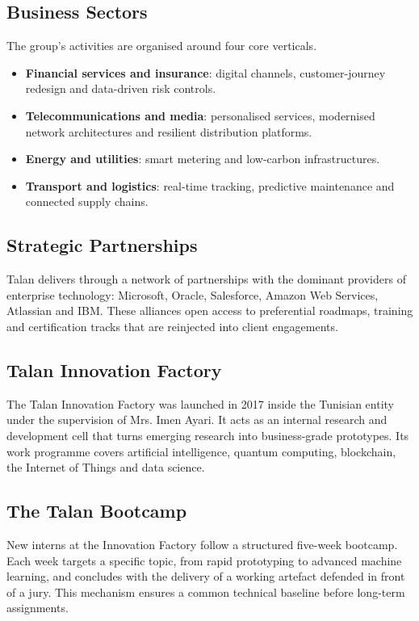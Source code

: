 \subsection{Business Sectors}
The group's activities are organised around four core verticals.
\begin{itemize}
    \item \textbf{Financial services and insurance}: digital channels,
    customer-journey redesign and data-driven risk controls.
    \item \textbf{Telecommunications and media}: personalised services,
    modernised network architectures and resilient distribution platforms.
    \item \textbf{Energy and utilities}: smart metering and low-carbon
    infrastructures.
    \item \textbf{Transport and logistics}: real-time tracking, predictive
    maintenance and connected supply chains.
\end{itemize}

\subsection{Strategic Partnerships}
Talan delivers through a network of partnerships with the dominant providers
of enterprise technology: Microsoft, Oracle, Salesforce, Amazon Web Services,
Atlassian and IBM. These alliances open access to preferential roadmaps,
training and certification tracks that are reinjected into client
engagements.

\subsection{Talan Innovation Factory}
The Talan Innovation Factory was launched in 2017 inside the Tunisian entity
under the supervision of Mrs. Imen Ayari. It acts as an internal research
and development cell that turns emerging research into business-grade
prototypes. Its work programme covers artificial intelligence, quantum
computing, blockchain, the Internet of Things and data science.

\subsection{The Talan Bootcamp}
New interns at the Innovation Factory follow a structured five-week
bootcamp. Each week targets a specific topic, from rapid prototyping to
advanced machine learning, and concludes with the delivery of a working
artefact defended in front of a jury. This mechanism ensures a common
technical baseline before long-term assignments.

